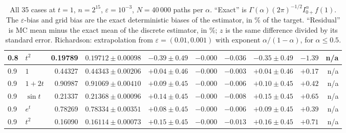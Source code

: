 \documentclass[11pt]{article}
\theoremstyle{remark}
\theoremstyle{definition}
\newcommand{\Ia}{I^{\alpha}_{0+}}
\begin{document}
\begin{table}[t]
\begin{tabular}{@{}llrrrrrrrr@{}}
0.8 & $t^2$ & 0.19789 & $0.19712\pm0.00098$ & $-0.39\pm0.49$ & $-0.000$ & $-0.036$ & $-0.35\pm0.49$ & $-1.39$ & n/a\\
\midrule
0.9 & $1$ & 0.44327 & $0.44343\pm0.00206$ & $+0.04\pm0.46$ & $-0.000$ & $-0.003$ & $+0.04\pm0.46$ & $+0.17$ & n/a\\
0.9 & $1+2t$ & 0.90987 & $0.91069\pm0.00410$ & $+0.09\pm0.45$ & $-0.000$ & $-0.006$ & $+0.10\pm0.45$ & $+0.42$ & n/a\\
0.9 & $\sin t$ & 0.21337 & $0.21368\pm0.00096$ & $+0.14\pm0.45$ & $-0.000$ & $-0.008$ & $+0.15\pm0.45$ & $+0.65$ & n/a\\
0.9 & $e^t$ & 0.78269 & $0.78334\pm0.00351$ & $+0.08\pm0.45$ & $-0.000$ & $-0.006$ & $+0.09\pm0.45$ & $+0.39$ & n/a\\
0.9 & $t^2$ & 0.16090 & $0.16114\pm0.00073$ & $+0.15\pm0.45$ & $-0.000$ & $-0.013$ & $+0.16\pm0.45$ & $+0.71$ & n/a\\
\bottomrule
\end{tabular}
\caption{All 35 cases at $t=1$, $n=2^{15}$, $\varepsilon=10^{-3}$, $N=40\,000$ paths per $\alpha$. ``Exact'' is $\Gamma(\alpha)(2\pi)^{-1/2}\Ia f(1)$. The $\varepsilon$-bias and grid bias are the exact deterministic biases of the estimator, in \% of the target. ``Residual'' is MC mean minus the exact mean of the discrete estimator, in \%; $z$ is the same difference divided by its standard error. Richardson: extrapolation from $\varepsilon=(0.01,0.001)$ with exponent $\alpha/(1-\alpha)$, for $\alpha\le0.5$.}
\label{tab:main}
\end{table}
\end{document}
